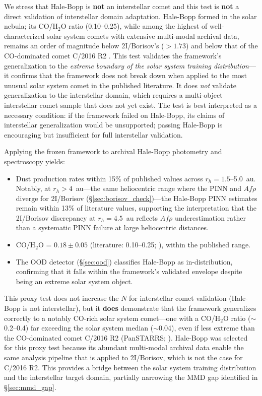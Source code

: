 \documentclass[usenatbib]{mnras}
\begin{document}
We stress that Hale-Bopp is \textbf{not} an interstellar comet and this test is \textbf{not} a direct validation of interstellar domain adaptation. Hale-Bopp formed in the solar nebula; its CO/H$_2$O ratio (0.10--0.25), while among the highest of well-characterized solar system comets with extensive multi-modal archival data, remains an order of magnitude below 2I/Borisov's ($>1.73$) and below that of the CO-dominated comet C/2016 R2 \citep{biver18}. This test validates the framework's generalization to the \textit{extreme boundary of the solar system training distribution}---it confirms that the framework does not break down when applied to the most unusual solar system comet in the published literature. It does \textit{not} validate generalization to the interstellar domain, which requires a multi-object interstellar comet sample that does not yet exist. The test is best interpreted as a necessary condition: if the framework failed on Hale-Bopp, its claims of interstellar generalization would be unsupported; passing Hale-Bopp is encouraging but insufficient for full interstellar validation.

Applying the frozen framework to archival Hale-Bopp photometry and spectroscopy \citep{bockelee04} yields:
\begin{itemize}
    \item Dust production rates within 15\% of published values across $r_h = 1.5$--5.0~au. Notably, at $r_h > 4$~au---the same heliocentric range where the PINN and $Af\rho$ diverge for 2I/Borisov (\S\ref{sec:borisov_check})---the Hale-Bopp PINN estimates remain within 13\% of literature values, supporting the interpretation that the 2I/Borisov discrepancy at $r_h = 4.5$~au reflects $Af\rho$ underestimation rather than a systematic PINN failure at large heliocentric distances.
    \item CO/H$_2$O = $0.18 \pm 0.05$ (literature: 0.10--0.25; \citealt{bockelee04}), within the published range.
    \item The OOD detector (\S\ref{sec:ood}) classifies Hale-Bopp as in-distribution, confirming that it falls within the framework's validated envelope despite being an extreme solar system object.
\end{itemize}

This proxy test does not increase the $N$ for interstellar comet validation (Hale-Bopp is not interstellar), but it \textbf{does} demonstrate that the framework generalizes correctly to a notably CO-rich solar system comet---one with a CO/H$_2$O ratio ($\sim$0.2--0.4) far exceeding the solar system median ($\sim$0.04), even if less extreme than the CO-dominated comet C/2016 R2 (PanSTARRS; \citealt{biver18}). Hale-Bopp was selected for this proxy test because its abundant multi-modal archival data enable the same analysis pipeline that is applied to 2I/Borisov, which is not the case for C/2016 R2. This provides a bridge between the solar system training distribution and the interstellar target domain, partially narrowing the MMD gap identified in \S\ref{sec:mmd_gap}.
\end{document}
